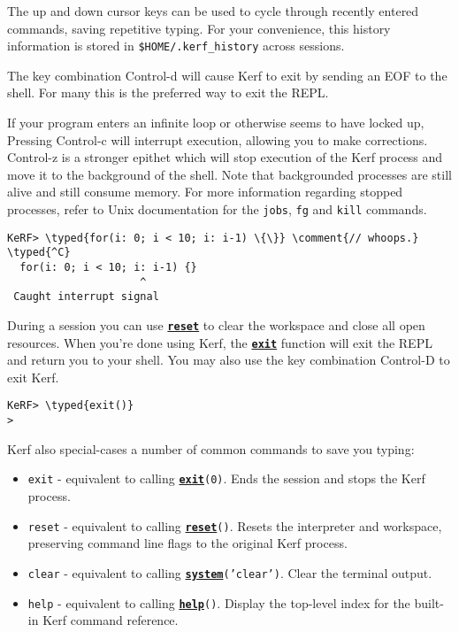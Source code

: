 \documentclass{article}
\newcommand{\typed}[1]{\textcolor{TealBlue}{#1}}
\newcommand{\comment}[1]{\textcolor{Orange}{#1}}
\newcommand{\primu}[2]{\hyperref[prim:#2]{\textbf{\texttt{#1}}}}
\newcommand{\prim}[1]{\primu{#1}{#1}}
\begin{document}
The up and down cursor keys can be used to cycle through recently entered commands, saving repetitive typing. For your convenience, this history information is stored in \texttt{\$HOME/.kerf\_history} across sessions.

\vspace{0.5cm}

The key combination Control-d will cause Kerf to exit by sending an EOF to the shell. For many this is the preferred way to exit the REPL.

\vspace{0.5cm}

If your program enters an infinite loop or otherwise seems to have locked up, Pressing Control-c will interrupt execution, allowing you to make corrections. Control-z is a stronger epithet which will stop execution of the Kerf process and move it to the background of the shell. Note that backgrounded processes are still alive and still consume memory. For more information regarding stopped processes, refer to Unix documentation for the \texttt{jobs}, \texttt{fg} and \texttt{kill} commands. 

\begin{Verbatim}
KeRF> \typed{for(i: 0; i < 10; i: i-1) \{\}} \comment{// whoops.}
\typed{^C}
  for(i: 0; i < 10; i: i-1) {}
                     ^
 Caught interrupt signal
\end{Verbatim}

\pagebreak
During a session you can use \prim{reset} to clear the workspace and close all open resources. When you're done using Kerf, the \prim{exit} function will exit the REPL and return you to your shell. You may also use the key combination Control-D to exit Kerf.
\begin{Verbatim}
KeRF> \typed{exit()}
>
\end{Verbatim}

Kerf also special-cases a number of common commands to save you typing:

\begin{itemize}
\item \texttt{exit} - equivalent to calling \texttt{\prim{exit}(0)}. Ends the session and stops the Kerf process.

\item \texttt{reset} - equivalent to calling \texttt{\prim{reset}()}. Resets the interpreter and workspace, preserving command line flags to the original Kerf process.

\item \texttt{clear} - equivalent to calling \texttt{\prim{system}('clear')}. Clear the terminal output.

\item \texttt{help} - equivalent to calling \texttt{\prim{help}()}. Display the top-level index for the built-in Kerf command reference.
\end{itemize}
\end{document}
